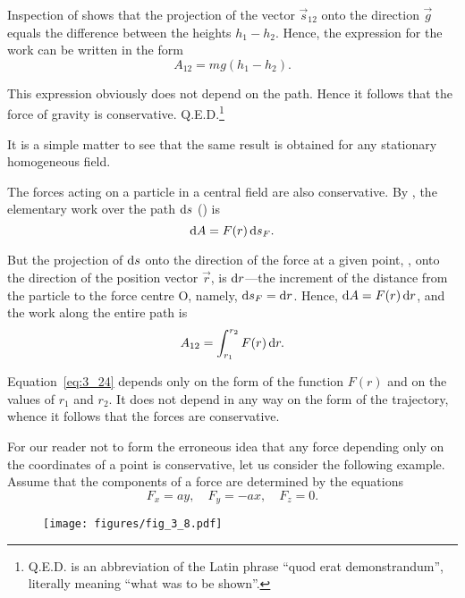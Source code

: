 \noindent
Inspection of  shows that the projection of the vector $\vec{s}_{12}$ onto the direction $\vec{g}$ equals the difference between the heights $h_1-h_2$. Hence, the expression for the work can be written in the form
\begin{equation}\label{eq:3_23}
A_{12} = mg(h_1-h_2).
\end{equation}

\noindent
This expression obviously does not depend on the path. Hence it follows that the force of gravity is conservative. Q.E.D.\footnote{Q.E.D. is an abbreviation of the Latin phrase ``quod erat demonstrandum'', literally meaning ``what was to be shown''.}

It is a simple matter to see that the same result is obtained for any stationary homogeneous field.

The forces acting on a particle in a central field are also conservative. By , the elementary work over the path $\mathrm{d} s$ () is
\begin{equation*}
\mathrm{d} A = F(r)\,\mathrm{d} s_F.
\end{equation*}

\noindent
But the projection of $\mathrm{d} s$ onto the direction of the force at a given point, \ie, onto the direction of the position vector $\vec{r}$, is $\mathrm{d} r$---the increment of the distance from the particle to the force centre O, namely, $\mathrm{d} s_F=\mathrm{d} r$. Hence, $\mathrm{d} A=F(r)\,\mathrm{d} r$, and the work along the entire path is
\begin{equation}\label{eq:3_24}
A_{12} = \int_{r_1}^{r_2} F(r)\,\mathrm{d} r.
\end{equation}

\noindent
Equation~\eqref{eq:3_24} depends only on the form of the function $F(r)$ and on the values of $r_1$ and $r_2$. It does not depend in any way on the form of the trajectory, whence it follows that the forces are conservative.

For our reader not to form the erroneous idea that any force depending only on the coordinates of a point is conservative, let us consider the following example. Assume that the components of a force are determined by the equations
\begin{equation}\label{eq:3_25}
F_x = ay,\quad F_y = -ax,\quad F_z=0.
\end{equation}

\begin{figure}[t]
	\begin{center}
		\texttt{[image: figures/fig\_3\_8.pdf]}
		\caption[]{}
		\label{fig:3_8}
	\end{center}
	\vspace{-0.7cm}
\end{figure}

